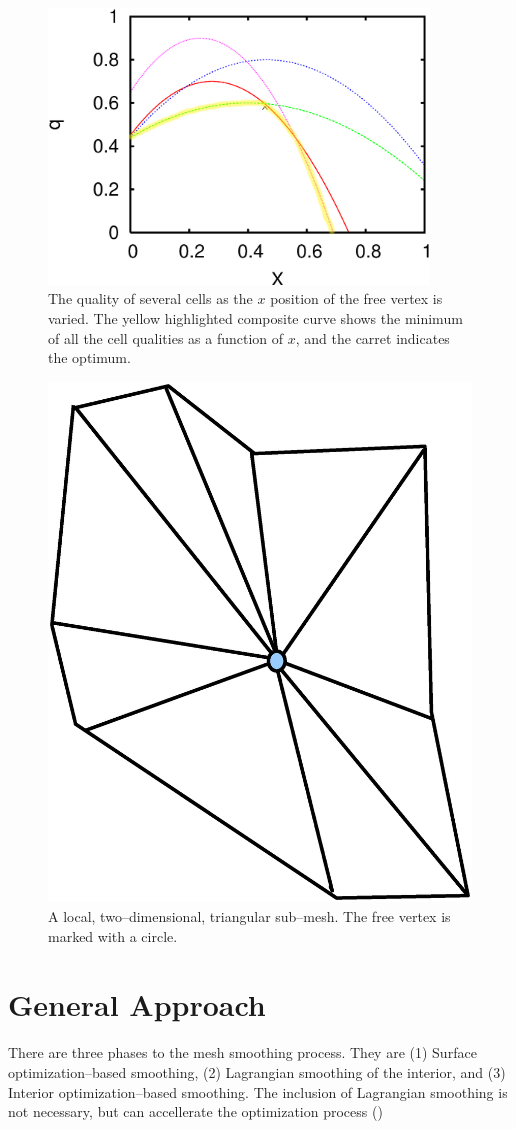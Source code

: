 \documentclass[a4paper,12pt,notitlepage]{article}
\begin{document}
\begin{figure}
  \centering
  \includegraphics[width=0.9\textwidth]{Images/qplot.eps}
  \caption{The quality of several cells as the $x$ position of the free
    vertex is varied. The yellow highlighted composite curve shows the minimum of all the cell
    qualities as a function of $x$, and the carret  indicates the
    optimum.}
  \label{fig:min_max}
\end{figure}

\begin{figure}
  \centering
  \includegraphics[width=.4\textwidth,height=.4\textwidth]{Images/submesh.eps}
  \caption{A local, two--dimensional, triangular sub--mesh.  The free
    vertex is marked with a circle.}
  \label{fig:submesh}
\end{figure}


\section{General Approach}
There are three phases to the mesh smoothing process.  They are (1)
Surface optimization--based smoothing, (2) Lagrangian smoothing of the
interior, and (3) Interior optimization--based smoothing.  The
inclusion of Lagrangian smoothing is not necessary, but can
accellerate the optimization process (\cite{optms:manual})
\end{document}

